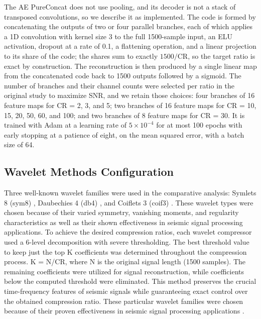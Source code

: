 \documentclass[fleqn,10pt]{wlscirep}
\begin{document}
The AE PureConcat \cite{helal2021seismic} does not use pooling, and its decoder is not a stack of transposed convolutions, so we describe it as implemented. The code is formed by concatenating the outputs of two or four parallel branches, each of which applies a 1D convolution with kernel size 3 to the full 1500-sample input, an ELU activation, dropout at a rate of 0.1, a flattening operation, and a linear projection to its share of the code; the shares sum to exactly $1500/\mathrm{CR}$, so the target ratio is exact by construction. The reconstruction is then produced by a single linear map from the concatenated code back to 1500 outputs followed by a sigmoid. The number of branches and their channel counts were selected per ratio in the original study \cite{helal2021seismic} to maximize SNR, and we retain those choices: four branches of 16 feature maps for CR = 2, 3, and 5; two branches of 16 feature maps for CR = 10, 15, 20, 50, 60, and 100; and two branches of 8 feature maps for CR = 30. It is trained with Adam at a learning rate of $5\times10^{-4}$ for at most 100 epochs with early stopping at a patience of eight, on the mean squared error, with a batch size of 64.

\subsection{Wavelet Methods Configuration}
\label{subsec:wavelet}

Three well-known wavelet families were used in the comparative analysis: Symlets 8 (sym8) \cite{daubechies1992ten,misiti2013wavelets}, Daubechies 4 (db4) \cite{daubechies1992ten,mallat1999wavelet}, and Coiflets 3 (coif3) \cite{coifman1992entropy,graps1995introduction}. These wavelet types were chosen because of their varied symmetry, vanishing moments, and regularity characteristics as well as their shown effectiveness in seismic signal processing applications. To achieve the desired compression ratios, each wavelet compressor used a 6-level decomposition with severe thresholding. The best threshold value to keep just the top K coefficients was determined throughout the compression process. K = N/CR, where N is the original signal length (1500 samples). The remaining coefficients were utilized for signal reconstruction, while coefficients below the computed threshold were eliminated. This method preserves the crucial time-frequency features of seismic signals while guaranteeing exact control over the obtained compression ratio. These particular wavelet families were chosen because of their proven effectiveness in seismic signal processing applications \cite{zhang2003automatic,baillard2014automatic}.
\end{document}

